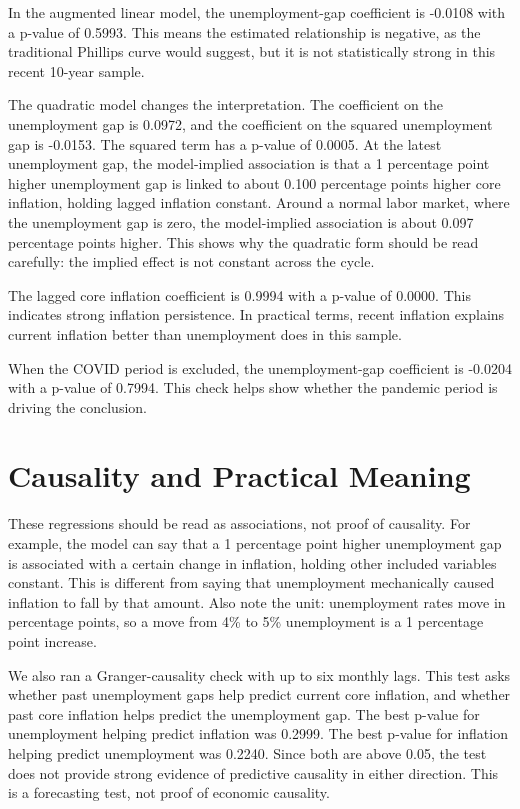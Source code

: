 \documentclass[11pt]{article}
\begin{document}
In the augmented linear model, the unemployment-gap coefficient is -0.0108 with a p-value of 0.5993. This means the estimated relationship is negative, as the traditional Phillips curve would suggest, but it is not statistically strong in this recent 10-year sample.

The quadratic model changes the interpretation. The coefficient on the unemployment gap is 0.0972, and the coefficient on the squared unemployment gap is -0.0153. The squared term has a p-value of 0.0005. At the latest unemployment gap, the model-implied association is that a 1 percentage point higher unemployment gap is linked to about 0.100 percentage points higher core inflation, holding lagged inflation constant. Around a normal labor market, where the unemployment gap is zero, the model-implied association is about 0.097 percentage points higher. This shows why the quadratic form should be read carefully: the implied effect is not constant across the cycle.

The lagged core inflation coefficient is 0.9994 with a p-value of 0.0000. This indicates strong inflation persistence. In practical terms, recent inflation explains current inflation better than unemployment does in this sample.

When the COVID period is excluded, the unemployment-gap coefficient is -0.0204 with a p-value of 0.7994. This check helps show whether the pandemic period is driving the conclusion.

\section*{Causality and Practical Meaning}
These regressions should be read as associations, not proof of causality. For example, the model can say that a 1 percentage point higher unemployment gap is associated with a certain change in inflation, holding other included variables constant. This is different from saying that unemployment mechanically caused inflation to fall by that amount. Also note the unit: unemployment rates move in percentage points, so a move from 4\% to 5\% unemployment is a 1 percentage point increase.

We also ran a Granger-causality check with up to six monthly lags. This test asks whether past unemployment gaps help predict current core inflation, and whether past core inflation helps predict the unemployment gap. The best p-value for unemployment helping predict inflation was 0.2999. The best p-value for inflation helping predict unemployment was 0.2240. Since both are above 0.05, the test does not provide strong evidence of predictive causality in either direction. This is a forecasting test, not proof of economic causality.
\end{document}
